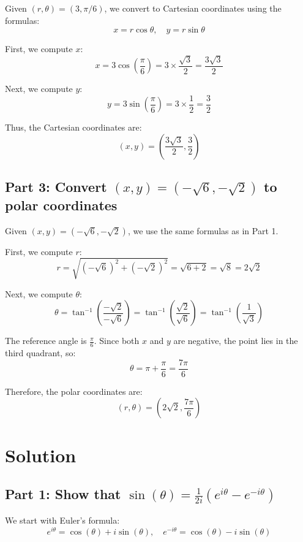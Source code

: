 \documentclass[11pt]{article}
\begin{document}
Given \( (r, \theta) = (3, \pi/6) \), we convert to Cartesian coordinates using the formulas:
\[
x = r \cos\theta, \quad y = r \sin\theta
\]

First, we compute \( x \):
\[
x = 3 \cos\left( \frac{\pi}{6} \right) = 3 \times \frac{\sqrt{3}}{2} = \frac{3\sqrt{3}}{2}
\]

Next, we compute \( y \):
\[
y = 3 \sin\left( \frac{\pi}{6} \right) = 3 \times \frac{1}{2} = \frac{3}{2}
\]

Thus, the Cartesian coordinates are:
\[
(x, y) = \left( \frac{3\sqrt{3}}{2}, \frac{3}{2} \right)
\]

\newpage

\subsection{Part 3: Convert \( (x, y) = (-\sqrt{6}, -\sqrt{2}) \) to polar coordinates}

Given \( (x, y) = (-\sqrt{6}, -\sqrt{2}) \), we use the same formulas as in Part 1.

First, we compute \( r \):
\[
r = \sqrt{(-\sqrt{6})^2 + (-\sqrt{2})^2} = \sqrt{6 + 2} = \sqrt{8} = 2\sqrt{2}
\]

Next, we compute \( \theta \):
\[
\theta = \tan^{-1}\left( \frac{-\sqrt{2}}{-\sqrt{6}} \right) = \tan^{-1}\left( \frac{\sqrt{2}}{\sqrt{6}} \right) = \tan^{-1}\left( \frac{1}{\sqrt{3}} \right)
\]

The reference angle is \( \frac{\pi}{6} \). Since both \( x \) and \( y \) are negative, the point lies in the third quadrant, so:
\[
\theta = \pi + \frac{\pi}{6} = \frac{7\pi}{6}
\]

Therefore, the polar coordinates are:
\[
(r, \theta) = \left( 2\sqrt{2}, \frac{7\pi}{6} \right)
\]




\newpage

\section{Solution}

\subsection{Part 1: Show that \( \sin(\theta) = \frac{1}{2i}(e^{i\theta} - e^{-i\theta}) \)}

We start with Euler's formula:
\[
e^{i\theta} = \cos(\theta) + i\sin(\theta), \quad e^{-i\theta} = \cos(\theta) - i\sin(\theta)
\]
\end{document}
